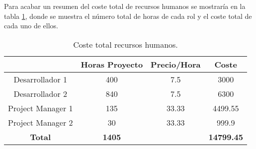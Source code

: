 Para acabar un resumen del coste total de recursos humanos se mostraría en la tabla \ref{tab:resumeHuman}, donde se muestra el número total de horas de cada rol y el coste total de cada uno de ellos.

\begin{table}[h]
\begin{center}
\begin{tabular}{cccc}
\hline
\rowcolor[HTML]{C0C0C0} 
\multicolumn{1}{|c|}{\cellcolor[HTML]{C0C0C0}\textbf{Rol}} & \multicolumn{1}{c|}{\cellcolor[HTML]{C0C0C0}\textbf{Horas Proyecto}} & \multicolumn{1}{c|}{\cellcolor[HTML]{C0C0C0}\textbf{Precio/Hora}} & \multicolumn{1}{c|}{\cellcolor[HTML]{C0C0C0}\textbf{Coste}} \\ \hline
\multicolumn{1}{|c|}{Desarrollador 1}                      & \multicolumn{1}{c|}{400}                                             & \multicolumn{1}{c|}{7.5}                                          & \multicolumn{1}{c|}{3000}                                   \\ \hline
\multicolumn{1}{|c|}{Desarrollador 2}                      & \multicolumn{1}{c|}{840}                                             & \multicolumn{1}{c|}{7.5}                                          & \multicolumn{1}{c|}{6300}                                   \\ \hline
\multicolumn{1}{|c|}{Project Manager 1}                    & \multicolumn{1}{c|}{135}                                             & \multicolumn{1}{c|}{33.33}                                        & \multicolumn{1}{c|}{4499.55}                                \\ \hline
\multicolumn{1}{|c|}{Project Manager 2}                    & \multicolumn{1}{c|}{30}                                              & \multicolumn{1}{c|}{33.33}                                        & \multicolumn{1}{c|}{999.9}                                  \\ \hline
\rowcolor[HTML]{656565} 
{\color[HTML]{FFFFFF} \textbf{Total}}                      & {\color[HTML]{FFFFFF} \textbf{1405}}                                 & {\color[HTML]{FFFFFF} \textbf{}}                                  & {\color[HTML]{FFFFFF} \textbf{14799.45}}                   
\end{tabular}
\end{center}
\caption{Coste total recursos humanos. \label{tab:resumeHuman}}
\end{table}
